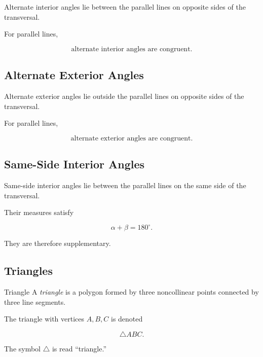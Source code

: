 Alternate interior angles lie between the parallel lines on opposite sides
of the transversal.

For parallel lines,

\[ \boxed{\text{alternate interior angles are congruent}.} \]

\subsection{Alternate Exterior Angles}
\label{subsec:alternate-exterior-angles}

Alternate exterior angles lie outside the parallel lines on opposite sides
of the transversal.

For parallel lines,

\[ \boxed{\text{alternate exterior angles are congruent}.} \]

\subsection{Same-Side Interior Angles}
\label{subsec:same-side-interior}

Same-side interior angles lie between the parallel lines on the same side of
the transversal.

Their measures satisfy

\[ \boxed{\alpha+\beta=180^\circ.} \]

They are therefore supplementary.

\subsection{Triangles}
\label{subsec:euclidean-triangles}

\begin{definitionbox}{Triangle}
A \emph{triangle} is a polygon formed by three noncollinear points connected
by three line segments.
\end{definitionbox}

The triangle with vertices \(A,B,C\) is denoted

\[ \triangle ABC. \]

The symbol \(\triangle\) is read ``triangle.''

